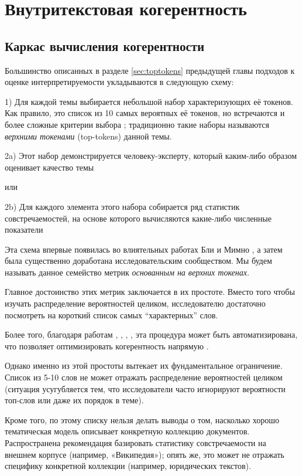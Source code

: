\chapter{Внутритекстовая когерентность}
\label{chap:coh}

\section{Каркас вычисления когерентности}

Большинство описанных в разделе \ref{sec:toptokens} предыдущей главы подходов к оценке интерпретируемости укладываются в следующую схему:

1) Для каждой темы выбирается небольшой набор характеризующих её токенов. Как правило, это список из 10 самых вероятных её токенов, но встречаются и более сложные критерии выбора \cite{blei2009topic}\cite{ldavis2014}\cite{boydcare}\cite{frex}; традиционно такие наборы называются \textit{верхними токенами} (top-tokens) данной темы.

2a) Этот набор демонстрируется человеку-эксперту, который каким-либо образом оценивает качество темы

или

2b) Для каждого элемента этого набора собирается ряд статистик совстречаемостей, на основе которого вычисляются какие-либо численные показатели

Эта схема впервые появилась во влиятельных работах Бли \cite{rtl} \cite{mrtl} и Мимно \cite{mimno2011}, а затем была существенно доработана исследовательским сообществом. Мы будем называть данное семейство метрик \textit{основанным на верхних токенах}.

Главное достоинство этих метрик заключается в их простоте. Вместо того чтобы изучать распределение вероятностей целиком, исследователю достаточно посмотреть на короткий список самых ``характерных'' слов.

Более того, благодаря работам \cite{mrtl}, \cite{mimno2011}, \cite{aletras2013evaluating}, \cite{roder2015exploring}, эта процедура может быть автоматизирована, что позволяет оптимизировать когерентность напрямую \cite{4keys}.

Однако именно из этой простоты вытекает их фундаментальное ограничение. Список из 5-10 слов не может отражать распределение вероятностей целиком (ситуация усугубляется тем, что исследователи часто игнорируют вероятности топ-слов или даже их порядок в теме).

Кроме того, по этому списку нельзя делать выводы о том, насколько хорошо тематическая модель описывает конкретную коллекцию документов. Распространена рекомендация базировать статистику совстречаемости на внешнем корпусе (например, «Википедия»); опять же, это может не отражать специфику конкретной коллекции (например, юридических текстов).

